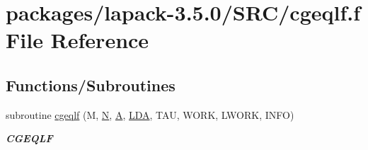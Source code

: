 \hypertarget{cgeqlf_8f}{}\section{packages/lapack-\/3.5.0/\+S\+R\+C/cgeqlf.f File Reference}
\label{cgeqlf_8f}
\subsection*{Functions/\+Subroutines}
\begin{DoxyCompactItemize}
\item 
subroutine \hyperlink{group__complexGEcomputational_ga085bbc018c80dcb9db6bac7f1edb0d5e}{cgeqlf} (M, \hyperlink{polmisc_8c_a0240ac851181b84ac374872dc5434ee4}{N}, \hyperlink{classA}{A}, \hyperlink{example__user_8c_ae946da542ce0db94dced19b2ecefd1aa}{L\+D\+A}, T\+A\+U, W\+O\+R\+K, L\+W\+O\+R\+K, I\+N\+F\+O)
\begin{DoxyCompactList}\small\item\em {\bfseries C\+G\+E\+Q\+L\+F} \end{DoxyCompactList}\end{DoxyCompactItemize}
